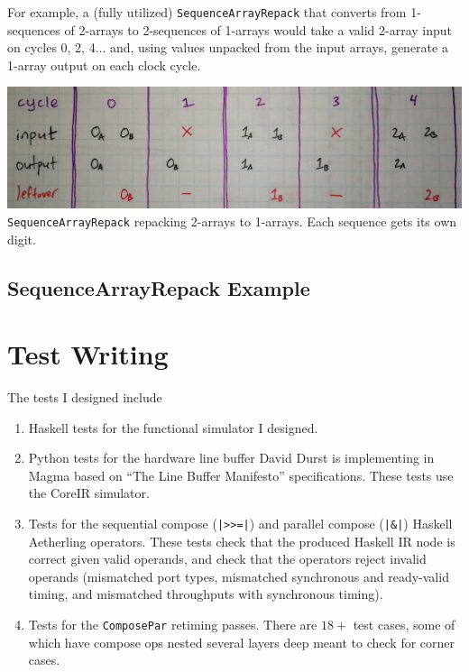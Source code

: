 \documentclass[12pt]{article}
\begin{document}
For example, a (fully utilized) \texttt{SequenceArrayRepack} that converts
from 1-sequences of 2-arrays to 2-sequences of 1-arrays would take a
valid 2-array input on cycles 0, 2, 4... and, using values unpacked from
the input arrays, generate a 1-array output on each clock cycle.

\begin{center}
\includegraphics[width=1.0\linewidth]{Figures/repack.jpg}
\texttt{SequenceArrayRepack} repacking 2-arrays to 1-arrays.
Each sequence gets its own digit.
\end{center}



\subsection{SequenceArrayRepack Example}

\section{Test Writing}

The tests I designed include
\begin{enumerate}
\item

Haskell tests for the functional simulator I designed.

\item

Python tests for the hardware line buffer David Durst is
implementing in Magma based on ``The Line Buffer Manifesto''
specifications. These tests use the CoreIR simulator.

\item

Tests for the sequential compose (\texttt{|>>=|}) and parallel
compose (\texttt{|\&|}) Haskell Aetherling operators. These tests
check that the produced Haskell IR node is correct given valid
operands, and check that the operators reject invalid operands
(mismatched port types, mismatched synchronous and ready-valid
timing, and mismatched throughputs with synchronous timing).

\item Tests for the \texttt{ComposePar} retiming passes. There are
$18+$ test cases, some of which have compose ops nested several
layers deep meant to check for corner cases.
\end{enumerate}
\end{document}
